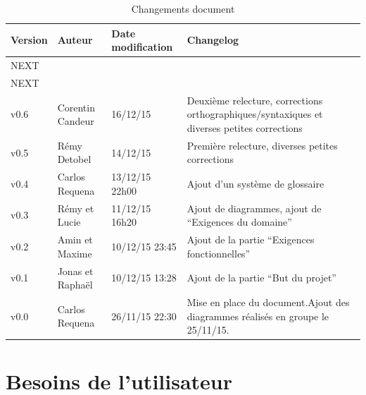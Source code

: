 \documentclass[11pt,a4paper]{article}
\begin{document}
\begin{table}[h]
  \centering
  \begin{tabular}[ht]{|l|l|l|p{18em}|}
    \hline

    \textbf{Version}
    & \textbf{Auteur}
    & \textbf{Date modification}
    & \textbf{Changelog}\\ \hline \hline
    NEXT &  &  &  \\ \hline
    NEXT &  &  &  \\ \hline
     v0.6 & Corentin Candeur & 16/12/15 & Deuxième relecture, corrections orthographiques/syntaxiques et diverses petites corrections \\ \hline
    v0.5 & Rémy Detobel & 14/12/15 & Première relecture, diverses petites corrections \\ \hline
    v0.4 & Carlos Requena  & 13/12/15 22h00 & Ajout d'un système de glossaire \\ \hline
    v0.3 & Rémy et Lucie  & 11/12/15 16h20 & Ajout de diagrammes, ajout de ``Exigences du domaine'' \\ \hline
    v0.2 & Amin et Maxime & 10/12/15 23:45 & Ajout de la partie ``Exigences fonctionnelles''\\ \hline
    v0.1 & Jonas et Raphaël & 10/12/15 13:28 & Ajout de la partie ``But du projet''\\ \hline
    v0.0 & Carlos Requena & 26/11/15 22:30 & Mise en place du document.Ajout des diagrammes réalisés en groupe le 25/11/15.\\ \hline
  \end{tabular}
  \caption{Changements document}
  \label{tab:hist}
\end{table}


\glsaddall
\printnoidxglossaries


\section{Besoins de l'utilisateur}
\label{sec:besoins}
\end{document}
